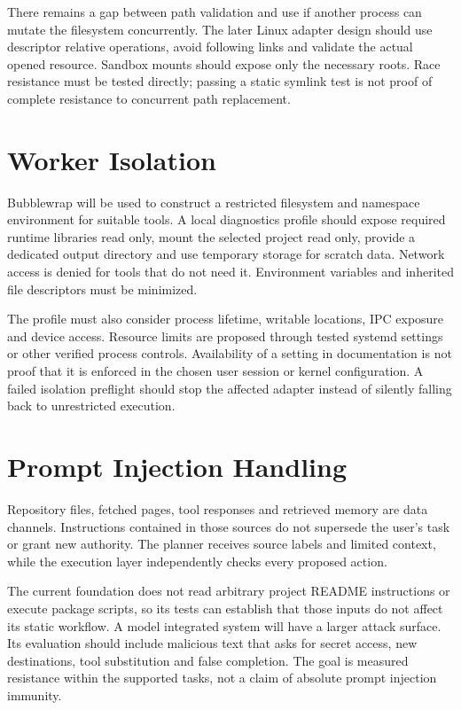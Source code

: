 There remains a gap between path validation and use if another process can mutate the filesystem concurrently. The later Linux adapter design should use descriptor relative operations, avoid following links and validate the actual opened resource. Sandbox mounts should expose only the necessary roots. Race resistance must be tested directly; passing a static symlink test is not proof of complete resistance to concurrent path replacement.

\section{Worker Isolation}
Bubblewrap will be used to construct a restricted filesystem and namespace environment for suitable tools. A local diagnostics profile should expose required runtime libraries read only, mount the selected project read only, provide a dedicated output directory and use temporary storage for scratch data. Network access is denied for tools that do not need it. Environment variables and inherited file descriptors must be minimized.

The profile must also consider process lifetime, writable locations, IPC exposure and device access. Resource limits are proposed through tested systemd settings or other verified process controls. Availability of a setting in documentation is not proof that it is enforced in the chosen user session or kernel configuration. A failed isolation preflight should stop the affected adapter instead of silently falling back to unrestricted execution.

\section{Prompt Injection Handling}
Repository files, fetched pages, tool responses and retrieved memory are data channels. Instructions contained in those sources do not supersede the user's task or grant new authority. The planner receives source labels and limited context, while the execution layer independently checks every proposed action.

The current foundation does not read arbitrary project README instructions or execute package scripts, so its tests can establish that those inputs do not affect its static workflow. A model integrated system will have a larger attack surface. Its evaluation should include malicious text that asks for secret access, new destinations, tool substitution and false completion. The goal is measured resistance within the supported tasks, not a claim of absolute prompt injection immunity.

